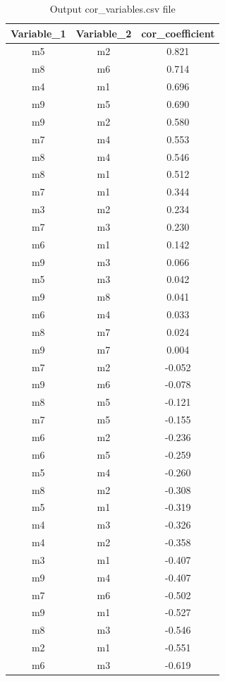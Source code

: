 \documentclass[english,a4paper,12pt]{article}
\begin{document}
\begin{table}[!h]
\caption[Correlation between variables]{Output \textsf{cor\_variables.csv} file}
    \begin{center}
        \begin{tabular}{ccc}
        \toprule
          Variable\_1 & Variable\_2 & cor\_coefficient\\
        \midrule
          m5 & m2 & 0.821\\
          m8 & m6 & 0.714\\
          m4 & m1 & 0.696\\
          m9 & m5 & 0.690\\
          m9 & m2 & 0.580\\
          m7 & m4 & 0.553\\
          m8 & m4 & 0.546\\
          m8 & m1 & 0.512\\
          m7 & m1 & 0.344\\
          m3 & m2 & 0.234\\
          m7 & m3 & 0.230\\
          m6 & m1 & 0.142\\
          m9 & m3 & 0.066\\
          m5 & m3 & 0.042\\
          m9 & m8 & 0.041\\
          m6 & m4 & 0.033\\
          m8 & m7 & 0.024\\
          m9 & m7 & 0.004\\
          m7 & m2 & -0.052\\
          m9 & m6 & -0.078\\
          m8 & m5 & -0.121\\
          m7 & m5 & -0.155\\
          m6 & m2 & -0.236\\
          m6 & m5 & -0.259\\
          m5 & m4 & -0.260\\
          m8 & m2 & -0.308\\
          m5 & m1 & -0.319\\
          m4 & m3 & -0.326\\
          m4 & m2 & -0.358\\
          m3 & m1 & -0.407\\
          m9 & m4 & -0.407\\
          m7 & m6 & -0.502\\
          m9 & m1 & -0.527\\
          m8 & m3 & -0.546\\
          m2 & m1 & -0.551\\
          m6 & m3 & -0.619\\
        \bottomrule
        \end{tabular}
    \end{center}
\label{tab:cor_var}
\end{table}
\end{document}

